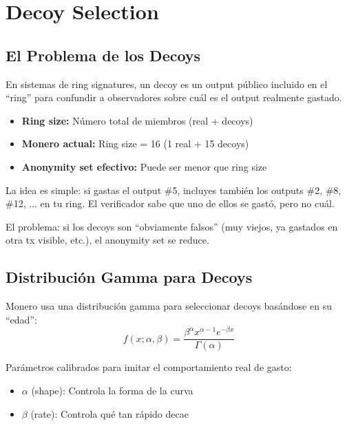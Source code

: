 \documentclass[11pt,a4paper,twoside]{book}
\begin{document}
\section{Decoy Selection}
\label{sec:decoy-selection}

\subsection{El Problema de los Decoys}

\begin{definition}
En sistemas de ring signatures, un decoy es un output p\'ublico incluido en el ``ring'' para confundir a observadores sobre cu\'al es el output realmente gastado.
\begin{itemize}
    \item \textbf{Ring size:} N\'umero total de miembros (real + decoys)
    \item \textbf{Monero actual:} Ring size = 16 (1 real + 15 decoys)
    \item \textbf{Anonymity set efectivo:} Puede ser menor que ring size
\end{itemize}
\end{definition}

\begin{intuicion}
La idea es simple: si gastas el output \#5, incluyes tambi\'en los outputs \#2, \#8, \#12, ... en tu ring. El verificador sabe que uno de ellos se gast\'o, pero no cu\'al.

El problema: si los decoys son ``obviamente falsos'' (muy viejos, ya gastados en otra tx visible, etc.), el anonymity set se reduce.
\end{intuicion}

\subsection{Distribuci\'on Gamma para Decoys}

\begin{definition}
Monero usa una distribuci\'on gamma para seleccionar decoys bas\'andose en su ``edad'':
\[
f(x; \alpha, \beta) = \frac{\beta^\alpha x^{\alpha-1} e^{-\beta x}}{\Gamma(\alpha)}
\]

Par\'ametros calibrados para imitar el comportamiento real de gasto:
\begin{itemize}
    \item $\alpha$ (shape): Controla la forma de la curva
    \item $\beta$ (rate): Controla qu\'e tan r\'apido decae
\end{itemize}
\end{definition}
\end{document}
